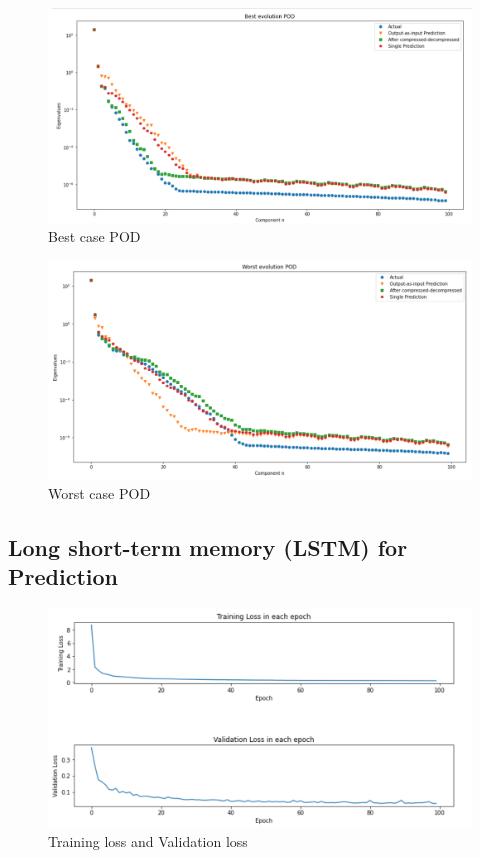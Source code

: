 \begin{figure}[H]
    \caption{Best case POD}
    \includegraphics[scale=0.5]{Report LaTeX/figures/mantle_convection_images/larger_dataset/FNN_Best_POD.png}
\end{figure}

\begin{figure}[H]
    \caption{Worst case POD}
    \includegraphics[scale=0.5]{Report LaTeX/figures/mantle_convection_images/larger_dataset/FNN_Worst_POD.png}
\end{figure}


\subsection{Long short-term memory (LSTM) for Prediction}

\begin{figure}[H]
    \caption{Training loss and Validation loss}
    \includegraphics[scale=0.6]{Report LaTeX/figures/mantle_convection_images/larger_dataset/LSTM_trainingData.png}
\end{figure}

